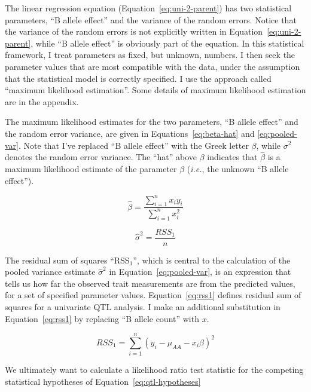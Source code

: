 \documentclass[oneside]{book}\usepackage[]{graphicx}\usepackage[]{color}
\begin{document}
The linear regression equation (Equation~\ref{eq:uni-2-parent}) has two statistical 
parameters, ``B allele effect'' and the variance of the random errors. Notice that 
the variance of the random errors is not explicitly written in 
Equation~\ref{eq:uni-2-parent}, while ``B allele effect'' is obviously part 
of the equation. In this 
statistical framework, I treat parameters as fixed, but unknown, numbers. I then 
seek the parameter values that are most compatible with the data, under the 
assumption that the statistical model is correctly specified. I use the approach 
called ``maximum likelihood estimation''. Some details of maximum likelihood 
estimation are in the appendix.

The maximum likelihood estimates for the two parameters, ``B allele effect'' and 
the random error variance, are given in Equations~\ref{eq:beta-hat} and
\ref{eq:pooled-var}. Note that I've replaced ``B allele effect'' with 
the Greek letter 
$\beta$, while $\sigma^2$ denotes the random error variance. The ``hat'' 
above $\beta$ indicates that $\hat\beta$ is a maximum likelihood estimate of the 
parameter $\beta$ (\emph{i.e.}, the unknown ``B allele effect'').

\begin{equation}
\hat\beta = \frac{\sum_{i=1}^nx_iy_i}{\sum_{i = 1}^nx_i^2}
\label{eq:beta-hat}
\end{equation}



\begin{equation}
\widehat\sigma^2 = \frac{RSS_1}{n}
\label{eq:pooled-var}
\end{equation}

The residual sum of squares ``RSS$_1$'', which is central to the
calculation of the pooled variance estimate $\widehat\sigma^2$ in Equation~\ref{eq:pooled-var}, is an expression that
tells us how far the observed trait measurements are
from the predicted values, for a
set of specified parameter values. Equation~\ref{eq:rss1} defines residual
sum of squares for a univariate QTL analysis. I make an additional substitution in Equation~\ref{eq:rss1} by replacing ``B allele count'' with $x$. 

\begin{equation}
RSS_1 = \sum_{i=1}^n(y_i - \mu_{AA} - x_i\beta)^2
\label{eq:rss1}
\end{equation}

We ultimately want to calculate a likelihood ratio test statistic
for the competing statistical hypotheses of Equation~\ref{eq:qtl-hypotheses}
\end{document}
